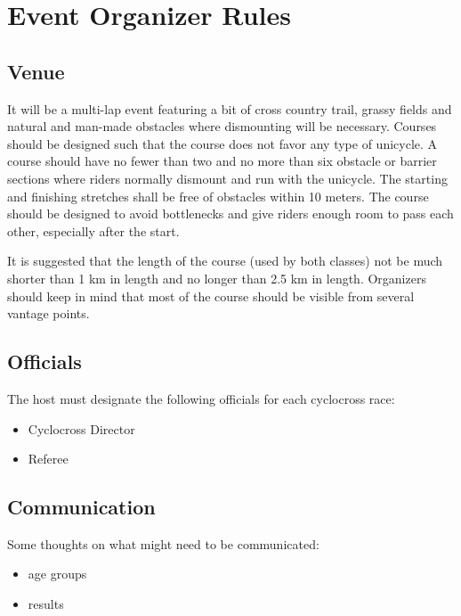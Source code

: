 \chapter{Event Organizer Rules}

\section{Venue}

It will be a multi-lap event featuring a bit of cross country trail, grassy fields and natural and man-made obstacles where dismounting will be necessary.
Courses should be designed such that the course does not favor any type of unicycle.
A course should have no fewer than two and no more than six obstacle or barrier sections where riders normally dismount and run with the unicycle.
The starting and finishing stretches shall be free of obstacles within 10 meters.
The course should be designed to avoid bottlenecks and give riders enough room to pass each other, especially after the start.

It is suggested that the length of the course (used by both classes) not be much shorter than 1 km in length and no longer than 2.5 km in length.
Organizers should keep in mind that most of the course should be visible from several vantage points.

\section{Officials}

The host must designate the following officials for each cyclocross race:
\begin{itemize}
\item Cyclocross Director
\item Referee
\end{itemize}

\section{Communication}

\begin{comment2016}
Some thoughts on what might need to be communicated:
\begin{itemize}
\item age groups
\item results
\end{itemize}
\end{comment2016}


